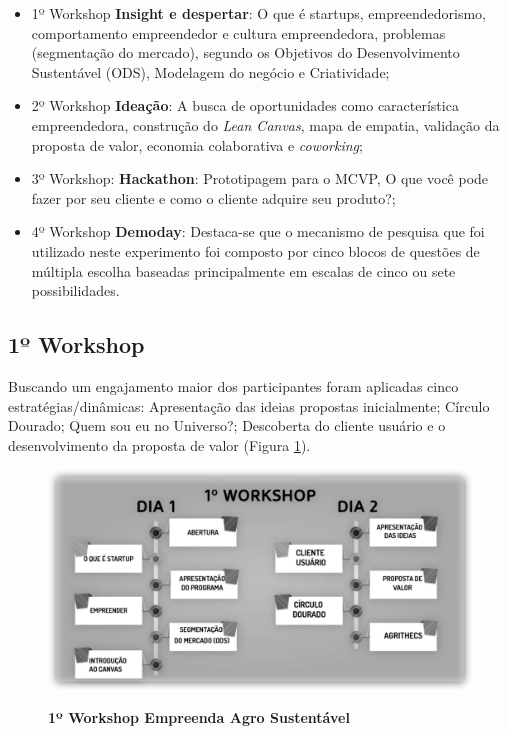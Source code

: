 \begin{itemize}

\item {1º Workshop \textbf{Insight e despertar}: O que é startups, empreendedorismo, comportamento empreendedor e cultura empreendedora, problemas (segmentação do mercado), segundo os Objetivos do Desenvolvimento Sustentável (ODS), Modelagem do negócio e Criatividade;}
\item {2º Workshop \textbf{Ideação}: A busca de oportunidades como característica empreendedora, construção do \textit{\textit{Lean Canvas}}, mapa de empatia, validação da proposta de valor, economia colaborativa e \textit{coworking};}

\item {3º Workshop: \textbf{Hackathon}: Prototipagem para o MCVP, O que você pode fazer por seu cliente e como o cliente adquire seu produto?;}

\item {4º Workshop \textbf{Demoday}: Destaca-se que o mecanismo de pesquisa que foi utilizado neste experimento foi composto por cinco blocos de questões de múltipla escolha baseadas principalmente em escalas de cinco ou sete possibilidades.}
\end{itemize}

\subsection{1º Workshop}

Buscando um engajamento maior dos participantes foram aplicadas cinco estratégias/dinâmicas: Apresentação das ideias propostas inicialmente; Círculo Dourado; Quem sou eu no Universo?; Descoberta do cliente usuário e o  desenvolvimento da proposta de valor (Figura \ref{figura_30}).

\begin{figure}[!h]
\centering
\caption{\textbf{1º Workshop Empreenda Agro Sustentável}}
\includegraphics[scale=0.3]{Imagens/workshop-01.png}
\label{figura_30}
\end{figure}

